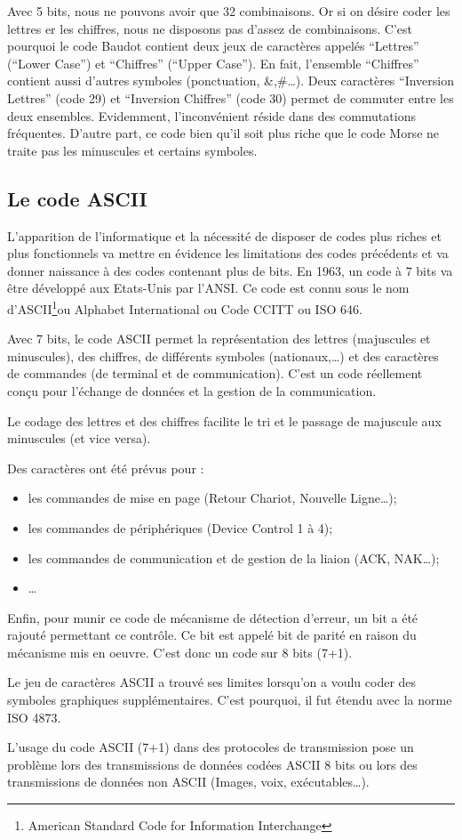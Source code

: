 	Avec 5 bits, nous ne pouvons avoir que 32 combinaisons. Or si on désire coder les lettres er
	les chiffres, nous ne disposons pas d'assez de combinaisons. C'est pourquoi le code Baudot
	contient deux jeux de caractères appelés ``Lettres'' (``Lower Case'') et ``Chiffres'' (``Upper
	Case''). En fait, l'ensemble ``Chiffres'' contient aussi d'autres symboles (ponctuation,
	\&,\#\ldots). Deux caractères ``Inversion Lettres'' (code 29) et ``Inversion Chiffres'' (code
	30) permet de commuter entre les deux ensembles. Evidemment, l'inconvénient réside dans des
	commutations fréquentes. D'autre part, ce code bien qu'il soit plus riche que le code Morse ne
	traite pas les minuscules et certains symboles.


	\subsection{Le code ASCII}
	L'apparition de l'informatique et la nécessité de disposer de codes plus riches et plus
	fonctionnels va mettre en évidence les limitations des codes précédents et va donner naissance
	à des codes contenant plus de bits. En 1963, un code à 7 bits va être développé aux Etats-Unis
	par l'ANSI. Ce code est connu sous le nom d'ASCII\footnote{American Standard Code for Information
Interchange}ou Alphabet International  ou Code CCITT  ou ISO 646.

Avec 7 bits, le code ASCII permet la représentation des lettres (majuscules et minuscules),
des chiffres, de différents symboles (nationaux,\ldots) et des caractères de commandes (de
terminal et de communication). C'est un code réellement conçu pour l'échange de données et la
gestion de la communication.

Le codage des lettres et des chiffres facilite le tri et le passage de majuscule aux
minuscules (et vice versa).

Des caractères ont été prévus pour :

\begin{itemize}
	\item les commandes de mise en page (Retour Chariot, Nouvelle Ligne\ldots);
	\item les commandes de périphériques (Device Control 1 à 4);
	\item les commandes de communication et de gestion de la liaion (ACK, NAK\ldots);
	\item \ldots
\end{itemize}

Enfin, pour munir ce code de mécanisme de détection d'erreur, un bit a été rajouté permettant
ce contrôle. Ce bit est appelé bit de parité en raison du mécanisme mis en oeuvre. C'est donc
un code sur 8 bits (7+1).

Le jeu de caractères ASCII a trouvé ses limites lorsqu'on a voulu coder des symboles
graphiques supplémentaires. C'est pourquoi, il fut étendu avec la norme ISO 4873.

L'usage du code ASCII (7+1) dans des protocoles de transmission pose un problème lors des
transmissions de données codées ASCII 8 bits ou lors des transmissions de données non ASCII
(Images, voix, exécutables\ldots).


